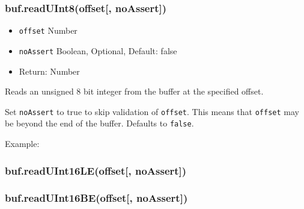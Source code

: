 \subsubsection{buf.readUInt8(offset{[},
noAssert{]})}\label{buf.readuint8offset-noassert}

\begin{itemize}
\itemsep1pt\parskip0pt
\item
  \texttt{offset} Number
\item
  \texttt{noAssert} Boolean, Optional, Default: false
\item
  Return: Number
\end{itemize}

Reads an unsigned 8 bit integer from the buffer at the specified offset.

Set \texttt{noAssert} to true to skip validation of \texttt{offset}.
This means that \texttt{offset} may be beyond the end of the buffer.
Defaults to \texttt{false}.

Example:

\begin{Shaded}
\begin{Highlighting}[]
  \NormalTok{(}\NormalTok{);}

\NormalTok{buf[}\NormalTok{] = }\NormalTok{;}
\NormalTok{buf[}\NormalTok{] = }\NormalTok{;}
\NormalTok{buf[}\NormalTok{] = }\NormalTok{;}
\NormalTok{buf[}\NormalTok{] = }\NormalTok{;}

 
  \NormalTok{(}
\NormalTok{\}}

\end{Highlighting}
\end{Shaded}

\subsubsection{buf.readUInt16LE(offset{[},
noAssert{]})}\label{buf.readuint16leoffset-noassert}

\subsubsection{buf.readUInt16BE(offset{[},
noAssert{]})}\label{buf.readuint16beoffset-noassert}

